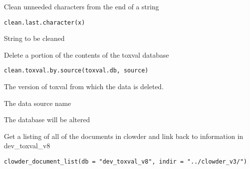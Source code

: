 \documentclass[letterpaper]{book}
\begin{document}
%
\begin{Description}\relax
Clean unneeded characters from the end of a string
\end{Description}
%
\begin{Usage}
\begin{verbatim}
clean.last.character(x)
\end{verbatim}
\end{Usage}
%
\begin{Arguments}
\begin{ldescription}
\item[\code{x}] String to be cleaned
\end{ldescription}
\end{Arguments}
%
\begin{Description}\relax
Delete a portion of the contents of the toxval database
\end{Description}
%
\begin{Usage}
\begin{verbatim}
clean.toxval.by.source(toxval.db, source)
\end{verbatim}
\end{Usage}
%
\begin{Arguments}
\begin{ldescription}
\item[\code{toxval.db}] The version of toxval from which the data is deleted.

\item[\code{source}] The data source name
\end{ldescription}
\end{Arguments}
%
\begin{Value}
The database will be altered
\end{Value}
%
\begin{Description}\relax
Get a listing of all of the documents in clowder and link back to information in
dev\_toxval\_v8
\end{Description}
%
\begin{Usage}
\begin{verbatim}
clowder_document_list(db = "dev_toxval_v8", indir = "../clowder_v3/")
\end{verbatim}
\end{Usage}
\end{document}
